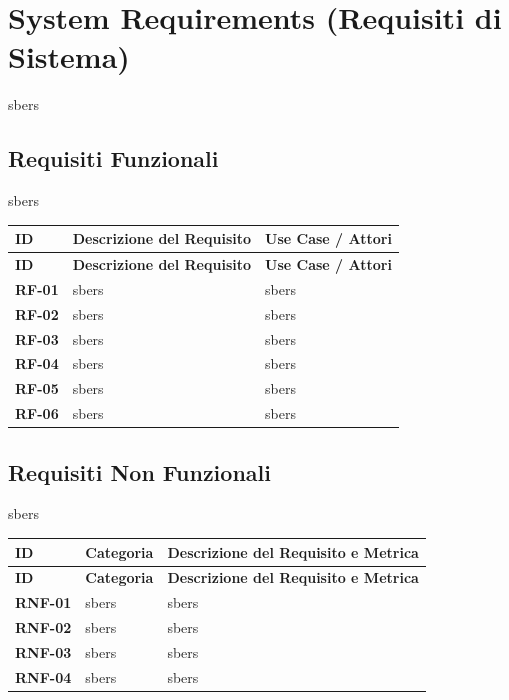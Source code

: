 \section{System Requirements (Requisiti di Sistema)}

sbers

\subsection{Requisiti Funzionali}

sbers

\begin{center}
\renewcommand{\arraystretch}{1.3}
\begin{longtable}{|p{2.5cm}|p{8.5cm}|p{4.5cm}|}
\hline
\rowcolor{tableheader} \textbf{ID} & \textbf{Descrizione del Requisito} & \textbf{Use Case / Attori} \\ \hline
\endfirsthead

\hline
\rowcolor{tableheader} \textbf{ID} & \textbf{Descrizione del Requisito} & \textbf{Use Case / Attori} \\ \hline
\endhead

\textbf{RF-01} & sbers & sbers \\ \hline
\textbf{RF-02} & sbers & sbers \\ \hline
\textbf{RF-03} & sbers & sbers \\ \hline
\textbf{RF-04} & sbers & sbers \\ \hline
\textbf{RF-05} & sbers & sbers \\ \hline
\textbf{RF-06} & sbers & sbers \\ \hline
\end{longtable}
\end{center}

\subsection{Requisiti Non Funzionali}

sbers

\begin{center}
\renewcommand{\arraystretch}{1.3}
\begin{longtable}{|p{2.5cm}|p{3.5cm}|p{9.5cm}|}
\hline
\rowcolor{tableheader} \textbf{ID} & \textbf{Categoria} & \textbf{Descrizione del Requisito e Metrica} \\ \hline
\endfirsthead

\hline
\rowcolor{tableheader} \textbf{ID} & \textbf{Categoria} & \textbf{Descrizione del Requisito e Metrica} \\ \hline
\endhead

\textbf{RNF-01} & sbers & sbers \\ \hline
\textbf{RNF-02} & sbers & sbers \\ \hline
\textbf{RNF-03} & sbers & sbers \\ \hline
\textbf{RNF-04} & sbers & sbers \\ \hline
\end{longtable}
\end{center}

